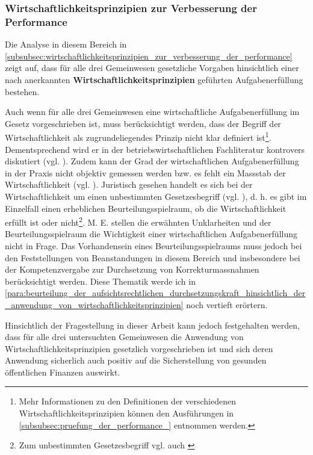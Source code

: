 \documentclass[10pt]{article}
\begin{document}
\subsubsection{Wirtschaftlichkeitsprinzipien zur Verbesserung der Performance}\label{subsubsec:wirtschaftlichkeitsprinzipien_zur_verbesserung_der_performance}
Die Analyse in diesem Bereich in \vref{subsubsec:wirtschaftlichkeitsprinzipien_zur_verbesserung_der_performance} zeigt auf, dass für alle drei Gemeinwesen gesetzliche Vorgaben hinsichtlich einer nach anerkannten \textbf{Wirtschaftlichkeitsprinzipien} geführten Aufgabenerfüllung bestehen. 

Auch wenn für alle drei Gemeinwesen eine wirtschaftliche Aufgabenerfüllung im Gesetz vorgeschrieben ist, muss berücksichtigt werden, dass der Begriff der Wirtschaftlichkeit als zugrundeliegendes Prinzip nicht klar definiert ist\footnote{Mehr Informationen zu den Definitionen der verschiedenen Wirtschaftlichkeitsprinzipien können den Ausführungen in \vref{subsubsec:pruefung_der_performance_} entnommen werden.}. Dementsprechend wird er in der betriebswirtschaftlichen Fachliteratur kontrovers diskutiert (vgl. \cite[10]{Holthoff1988}).  Zudem kann der Grad der wirtschaftlichen Aufgabenerfüllung in der Praxis nicht objektiv gemessen werden bzw. es fehlt ein Massstab der Wirtschaftlichkeit (vgl. \cite[9]{Holthoff1988}). Juristisch gesehen handelt es sich bei der Wirtschaftlichkeit um einen unbestimmten Gesetzesbegriff (vgl. \cite[9]{Holthoff1988}), d. h. es gibt im Einzelfall einen erheblichen Beurteilungsspielraum, ob die Wirtschaftlichkeit erfüllt ist oder nicht\footnote{Zum unbestimmten Gesetzesbegriff vgl. auch \cite[S. 221ff]{Tschannen2014}}. M. E. stellen die erwähnten Unklarheiten und der Beurteilungsspielraum die Wichtigkeit einer wirtschaftlichen Aufgabenerfüllung nicht in Frage. Das Vorhandensein eines Beurteilungs­spielraums muss jedoch bei den Feststellungen von Beanstandungen in diesem Bereich und insbesondere bei der Kompetenzvergabe zur Durchsetzung von Korrektur­mass­nahmen berücksichtigt werden. Diese Thematik werde ich in \vref{para:beurteilung_der_aufsichtsrechtlichen_durchsetzungskraft_hinsichtlich_der_anwendung_von_wirtschaftlichkeitsprinzipien} noch vertieft erörtern.

Hinsichtlich der Fragestellung in dieser Arbeit kann jedoch festgehalten werden, dass für alle drei untersuchten Gemeinwesen die Anwendung von Wirtschaftlichkeitsprinzipien gesetzlich vorgeschrieben ist und sich deren Anwendung sicherlich auch positiv auf die Sicherstellung von gesunden öffentlichen Finanzen auswirkt.
\end{document}

